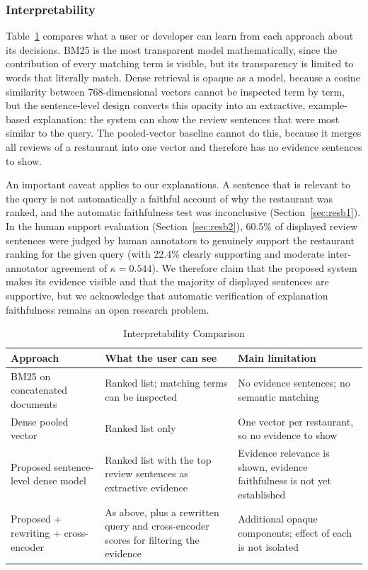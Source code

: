 \subsubsection{Interpretability}
\label{sec:discinterp}

Table~\ref{tab:discinterp} compares what a user or developer can learn from each approach about its decisions. BM25 is the most transparent model mathematically, since the contribution of every matching term is visible, but its transparency is limited to words that literally match. Dense retrieval is opaque as a model, because a cosine similarity between 768-dimensional vectors cannot be inspected term by term, but the sentence-level design converts this opacity into an extractive, example-based explanation: the system can show the review sentences that were most similar to the query. The pooled-vector baseline cannot do this, because it merges all reviews of a restaurant into one vector and therefore has no evidence sentences to show.

An important caveat applies to our explanations. A sentence that is relevant to the query is not automatically a faithful account of why the restaurant was ranked, and the automatic faithfulness test was inconclusive (Section~\ref{sec:resb1}). In the human support evaluation (Section~\ref{sec:resb2}), 60.5\% of displayed review sentences were judged by human annotators to genuinely support the restaurant ranking for the given query (with 22.4\% clearly supporting and moderate inter-annotator agreement of $\kappa = 0.544$). We therefore claim that the proposed system makes its evidence visible and that the majority of displayed sentences are supportive, but we acknowledge that automatic verification of explanation faithfulness remains an open research problem.

\begin{table}[htbp]
\centering
\caption{Interpretability Comparison}
\label{tab:discinterp}
\small
\begin{tabular}{|p{}|p{}|p{}|}
\hline
\textbf{Approach} & \textbf{What the user can see} & \textbf{Main limitation} \\
\hline
BM25 on concatenated documents & Ranked list; matching terms can be inspected & No evidence sentences; no semantic matching \\
\hline
Dense pooled vector & Ranked list only & One vector per restaurant, so no evidence to show \\
\hline
Proposed sentence-level dense model & Ranked list with the top review sentences as extractive evidence & Evidence relevance is shown, evidence faithfulness is not yet established \\
\hline
Proposed + rewriting + cross-encoder & As above, plus a rewritten query and cross-encoder scores for filtering the evidence & Additional opaque components; effect of each is not isolated \\
\hline
\end{tabular}
\end{table}

